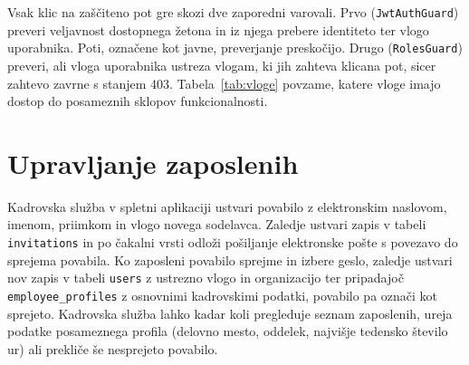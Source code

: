 Vsak klic na zaščiteno pot gre skozi dve zaporedni varovali. Prvo (\texttt{JwtAuthGuard}) preveri veljavnost dostopnega žetona in iz njega prebere identiteto ter vlogo uporabnika. Poti, označene kot javne, preverjanje preskočijo. Drugo (\texttt{RolesGuard}) preveri, ali vloga uporabnika ustreza vlogam, ki jih zahteva klicana pot, sicer zahtevo zavrne s stanjem 403. Tabela~\ref{tab:vloge} povzame, katere vloge imajo dostop do posameznih sklopov funkcionalnosti.

\begin{table}[htbp]
\centering
\caption{Poenostavljen pregled dostopa do posameznih sklopov po vlogah.}
\label{tab:vloge}
\end{table}
\FloatBarrier

\section{Upravljanje zaposlenih}
\label{sec:sistem-zaposleni}

Kadrovska služba v spletni aplikaciji ustvari povabilo z elektronskim naslovom, imenom, priimkom in vlogo novega sodelavca. Zaledje ustvari zapis v tabeli \texttt{invitations} in po čakalni vrsti odloži pošiljanje elektronske pošte s povezavo do sprejema povabila. Ko zaposleni povabilo sprejme in izbere geslo, zaledje ustvari nov zapis v tabeli \texttt{users} z ustrezno vlogo in organizacijo ter pripadajoč \texttt{employee\_profiles} z osnovnimi kadrovskimi podatki, povabilo pa označi kot sprejeto. Kadrovska služba lahko kadar koli pregleduje seznam zaposlenih, ureja podatke posameznega profila (delovno mesto, oddelek, najvišje tedensko število ur) ali prekliče še nesprejeto povabilo.

